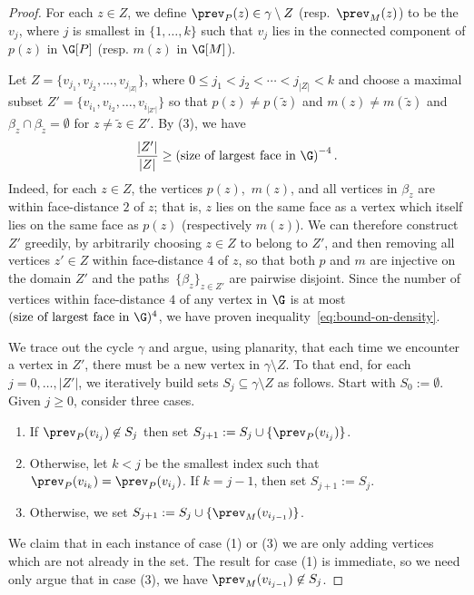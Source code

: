 \begin{proof}
	For each $z \in Z$, we define $\prev_P(z) \in \gamma \setminus Z$ (resp.\ $\prev_M(z)$) to be the $v_{j}$, where $j$ is smallest in $\{1, \dots, k\}$ such that $v_{j}$ lies in the connected component of $p(z)$ in $\G[P]$ (resp. $m(z)$ in $\G[M]$).
	
	Let $Z = \{v_{j_1}, v_{j_2}, \dots, v_{j_{|Z|}}\}$, where $0 \leq j_1 < j_2 < \cdots < j_{|Z|} < k$
	and choose a maximal subset $Z' = \{v_{i_1}, v_{i_2}, \dots, v_{i_{|Z'|}}\}$ so that $p(z) \neq p(\tilde z)$ and $m(z) \neq m(\tilde z)$ and $\beta_z \cap \beta_{\tilde z} = \emptyset$ for $z \neq \tilde z \in Z'$.
	By (3), we have
	\begin{equation} \label{eq:bound-on-density}
		\frac{|Z'|}{|Z|} \geq {(\mbox{size of largest face in $\G$})}^{-4} \, .
	\end{equation}
	Indeed, for each $z \in Z$, the vertices $p(z)$,~$m(z)$, and all vertices in $\beta_z$ are within face-distance $2$ of $z$; that is, $z$ lies on the same face as a vertex which itself lies on the same face as $p(z)$ (respectively $m(z)$). We can therefore construct $Z'$ greedily, by arbitrarily choosing $z \in Z$ to belong to $Z'$, and then removing all vertices $z' \in Z$ within face-distance $4$ of $z$, so that both $p$ and $m$ are injective on the domain $Z'$
	and the paths~$\{\beta_z\}_{z \in Z'}$ are pairwise disjoint. Since the number of vertices within face-distance $4$ of any vertex in $\G$ is at most $(\mbox{size of largest face in $\G$})^4$, we have proven inequality~\eqref{eq:bound-on-density}.
	
	We trace out the cycle $\gamma$ and argue, using planarity, that each time we encounter a vertex in $Z'$, there must be a new vertex in $\gamma \setminus Z$.  To that end, for each $j = 0, \dots, |Z'|$, we iteratively build sets $S_j \subseteq \gamma \setminus Z$ as follows. Start with $S_0 := \emptyset$. Given $j \geq 0$, consider three cases.
	\begin{enumerate}
		\item If $\prev_P(v_{i_j}) \not\in S_j$ then set $S_{j+1} := S_j \cup \{\prev_P(v_{i_j})\}$.
		\item Otherwise, let $k < j$ be the smallest index such that $\prev_P(v_{i_k}) = \prev_P(v_{i_j})$. If $k = j-1$, then set $S_{j+1} := S_j$.
		\item Otherwise, we set $S_{j+1} := S_j \cup \{\prev_M(v_{i_{j-1}})\}$.
	\end{enumerate}
	
	We claim that in each instance of case (1) or (3) we are only adding vertices which are not already in the set. The result for case (1) is immediate, so we need only argue that in case (3), we have $\prev_M(v_{i_{j-1}}) \not \in S_j$.
	

\end{proof}
